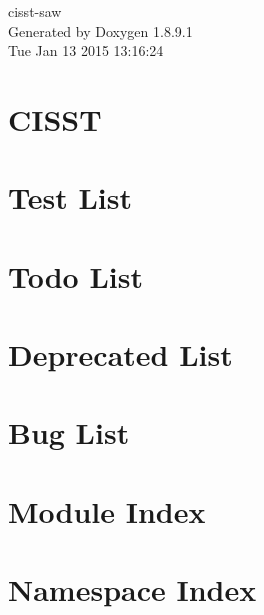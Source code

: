 \documentclass[twoside]{book}
\newcommand{\+}{\discretionary{\mbox{\scriptsize$\hookleftarrow$}}{}{}}
\newcommand{\clearemptydoublepage}{%
  \newpage{\pagestyle{empty}\cleardoublepage}%
}
\begin{document}
\hypersetup{pageanchor=false,
             bookmarks=true,
             bookmarksnumbered=true,
             pdfencoding=unicode
            }
\begin{titlepage}
\vspace*{7cm}
\begin{center}%
{\Large cisst-\/saw }\\
\vspace*{1cm}
{\large Generated by Doxygen 1.8.9.1}\\
\vspace*{0.5cm}
{\small Tue Jan 13 2015 13:16:24}\\
\end{center}
\end{titlepage}
\clearemptydoublepage
\tableofcontents
\clearemptydoublepage
{}
\hypersetup{pageanchor=true}

\chapter{C\+I\+S\+S\+T}
\label{index}\hypertarget{index}{}
\chapter{Test List}
\label{d4/df6/test}
\hypertarget{d4/df6/test}{}

\chapter{Todo List}
\label{dd/da0/todo}
\hypertarget{dd/da0/todo}{}

\chapter{Deprecated List}
\label{da/d58/deprecated}
\hypertarget{da/d58/deprecated}{}

\chapter{Bug List}
\label{de/da5/bug}
\hypertarget{de/da5/bug}{}

\chapter{Module Index}

\chapter{Namespace Index}

\end{document}
